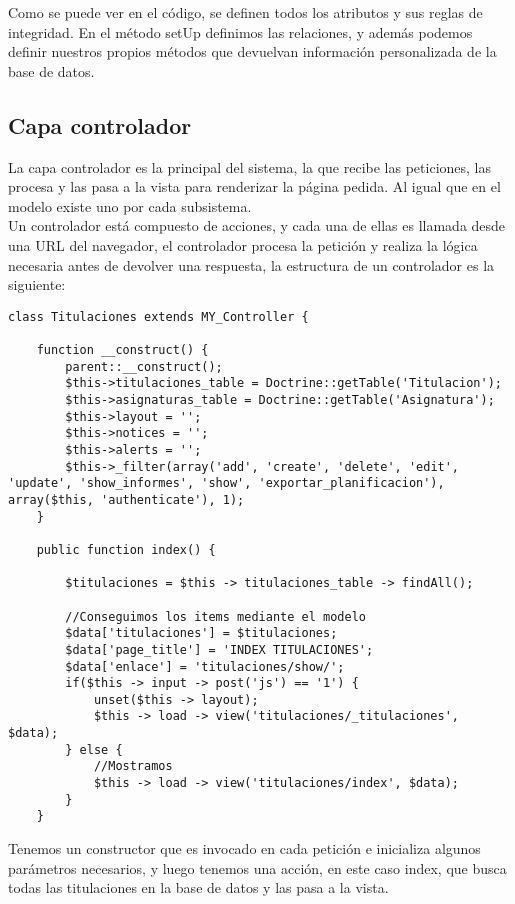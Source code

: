 Como se puede ver en el código, se definen todos los atributos y sus reglas de integridad. En el método setUp definimos las relaciones, y además podemos definir nuestros propios métodos que devuelvan información personalizada de la base de datos.

\subsection{Capa controlador}

La capa controlador es la principal del sistema, la que recibe las peticiones, las procesa y las pasa a la vista para renderizar la página pedida. Al igual que en el modelo existe uno por cada subsistema.\\

Un controlador está compuesto de acciones, y cada una de ellas es llamada desde una URL del navegador, el controlador procesa la petición y realiza la lógica necesaria antes de devolver una respuesta, la estructura de un controlador es la siguiente:

\begin{lstlisting}[style=PHP]
class Titulaciones extends MY_Controller {

    function __construct() {
        parent::__construct();
        $this->titulaciones_table = Doctrine::getTable('Titulacion');
        $this->asignaturas_table = Doctrine::getTable('Asignatura');
        $this->layout = '';
        $this->notices = '';
        $this->alerts = '';
        $this->_filter(array('add', 'create', 'delete', 'edit', 'update', 'show_informes', 'show', 'exportar_planificacion'), array($this, 'authenticate'), 1); 
    }

    public function index() {

        $titulaciones = $this -> titulaciones_table -> findAll();

        //Conseguimos los items mediante el modelo
        $data['titulaciones'] = $titulaciones;
        $data['page_title'] = 'INDEX TITULACIONES';
        $data['enlace'] = 'titulaciones/show/';
        if($this -> input -> post('js') == '1') {
            unset($this -> layout);
            $this -> load -> view('titulaciones/_titulaciones', $data);
        } else {
            //Mostramos
            $this -> load -> view('titulaciones/index', $data);
        }
    }
\end{lstlisting}

Tenemos un constructor que es invocado en cada petición e inicializa algunos parámetros necesarios, y luego tenemos una acción, en este caso index, que busca todas las titulaciones en la base de datos y las pasa a la vista.

